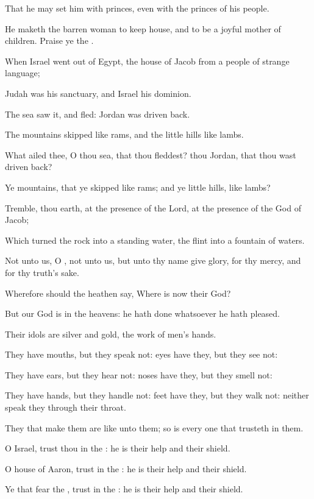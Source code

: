 \Verse That he may set him with princes, even with the princes of his people.

\Verse He maketh the barren woman to keep house, and to be a joyful mother of children. Praise ye the \LORD.




\Chapter
\Verse When Israel went out of Egypt, the house of Jacob from a people of strange language;

\Verse Judah was his sanctuary, and Israel his dominion.

\Verse The sea saw it, and fled: Jordan was driven back.

\Verse The mountains skipped like rams, and the little hills like lambs.

\Verse What ailed thee, O thou sea, that thou fleddest? thou Jordan, that thou wast driven back?

\Verse Ye mountains, that ye skipped like rams; and ye little hills, like lambs?

\Verse Tremble, thou earth, at the presence of the Lord, at the presence of the God of Jacob;

\Verse Which turned the rock into a standing water, the flint into a fountain of waters.




\Chapter
\Verse Not unto us, O \LORD, not unto us, but unto thy name give glory, for thy mercy, and for thy truth's sake.

\Verse Wherefore should the heathen say, Where is now their God?

\Verse But our God is in the heavens: he hath done whatsoever he hath pleased.

\Verse Their idols are silver and gold, the work of men's hands.

\Verse They have mouths, but they speak not: eyes have they, but they see not:

\Verse They have ears, but they hear not: noses have they, but they smell not:

\Verse They have hands, but they handle not: feet have they, but they walk not: neither speak they through their throat.

\Verse They that make them are like unto them; so is every one that trusteth in them.

\Verse O Israel, trust thou in the \LORD: he is their help and their shield.

\Verse O house of Aaron, trust in the \LORD: he is their help and their shield.

\Verse Ye that fear the \LORD, trust in the \LORD: he is their help and their shield.


